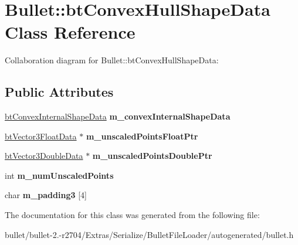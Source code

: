 \hypertarget{class_bullet_1_1bt_convex_hull_shape_data}{\section{Bullet\+:\+:bt\+Convex\+Hull\+Shape\+Data Class Reference}
\label{class_bullet_1_1bt_convex_hull_shape_data}
}


Collaboration diagram for Bullet\+:\+:bt\+Convex\+Hull\+Shape\+Data\+:
\subsection*{Public Attributes}
\begin{DoxyCompactItemize}
\item 
\hypertarget{class_bullet_1_1bt_convex_hull_shape_data_a384bd3de6f6d63497d5f8a704f1b471f}{\hyperlink{class_bullet_1_1bt_convex_internal_shape_data}{bt\+Convex\+Internal\+Shape\+Data} {\bfseries m\+\_\+convex\+Internal\+Shape\+Data}}\label{class_bullet_1_1bt_convex_hull_shape_data_a384bd3de6f6d63497d5f8a704f1b471f}

\item 
\hypertarget{class_bullet_1_1bt_convex_hull_shape_data_aa0fc7c2414ac0a2655143e78668b979d}{\hyperlink{class_bullet_1_1bt_vector3_float_data}{bt\+Vector3\+Float\+Data} $\ast$ {\bfseries m\+\_\+unscaled\+Points\+Float\+Ptr}}\label{class_bullet_1_1bt_convex_hull_shape_data_aa0fc7c2414ac0a2655143e78668b979d}

\item 
\hypertarget{class_bullet_1_1bt_convex_hull_shape_data_a14e14af4e714d572e6252d913e177414}{\hyperlink{class_bullet_1_1bt_vector3_double_data}{bt\+Vector3\+Double\+Data} $\ast$ {\bfseries m\+\_\+unscaled\+Points\+Double\+Ptr}}\label{class_bullet_1_1bt_convex_hull_shape_data_a14e14af4e714d572e6252d913e177414}

\item 
\hypertarget{class_bullet_1_1bt_convex_hull_shape_data_a0ef22b5280f0df7d1e4a96c5e6c211b8}{int {\bfseries m\+\_\+num\+Unscaled\+Points}}\label{class_bullet_1_1bt_convex_hull_shape_data_a0ef22b5280f0df7d1e4a96c5e6c211b8}

\item 
\hypertarget{class_bullet_1_1bt_convex_hull_shape_data_a726dc2ffbab444bc47063004ad2bdbf3}{char {\bfseries m\+\_\+padding3} \mbox{[}4\mbox{]}}\label{class_bullet_1_1bt_convex_hull_shape_data_a726dc2ffbab444bc47063004ad2bdbf3}

\end{DoxyCompactItemize}


The documentation for this class was generated from the following file\+:\begin{DoxyCompactItemize}
\item 
bullet/bullet-\/2.-\/r2704/\+Extras/\+Serialize/\+Bullet\+File\+Loader/autogenerated/bullet.\+h\end{DoxyCompactItemize}
